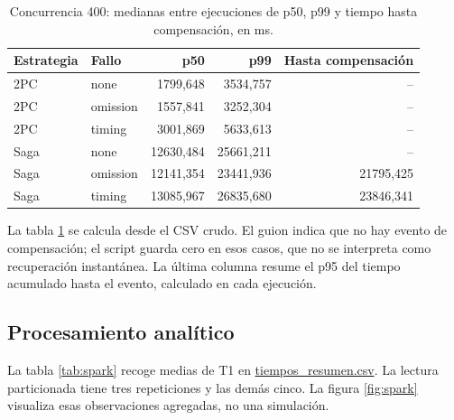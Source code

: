 \documentclass[12pt,a4paper]{article}
\newcommand{\evidencia}[2]{\href{https://github.com/JoseLozanoMorales/TiendaTech/blob/e6680b0290d2c6921ea47116c2df60bd7b055de0/#1}{#2}}
\begin{document}
\begin{table}[H]\centering\small
\caption{Concurrencia 400: medianas entre ejecuciones de p50, p99 y tiempo hasta compensación, en ms.}\label{tab:colas}
\begin{tabular}{llrrr}
\toprule Estrategia & Fallo & p50 & p99 & Hasta compensación\\\midrule
2PC & none & 1799,648 & 3534,757 & --\\
2PC & omission & 1557,841 & 3252,304 & --\\
2PC & timing & 3001,869 & 5633,613 & --\\
Saga & none & 12630,484 & 25661,211 & --\\
Saga & omission & 12141,354 & 23441,936 & 21795,425\\
Saga & timing & 13085,967 & 26835,680 & 23846,341\\\bottomrule
\end{tabular}
\end{table}
La tabla \ref{tab:colas} se calcula desde el CSV crudo. El guion indica que no hay evento de compensación; el script guarda cero en esos casos, que no se interpreta como recuperación instantánea. La última columna resume el p95 del tiempo acumulado hasta el evento, calculado en cada ejecución.

\subsection{Procesamiento analítico}
La tabla \ref{tab:spark} recoge medias de T1 en \evidencia{resultados/tiempos_resumen.csv}{tiempos\_resumen.csv}. La lectura particionada tiene tres repeticiones y las demás cinco. La figura \ref{fig:spark} visualiza esas observaciones agregadas, no una simulación.
\end{document}

